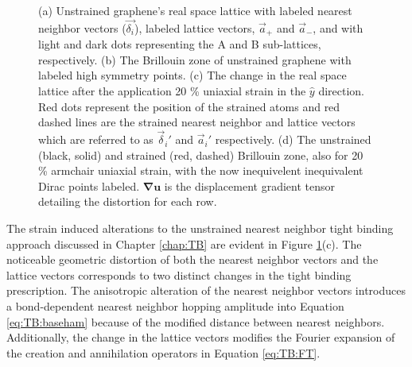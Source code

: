 \begin{figure}
  
  \caption{\label{fig:PVP:lattice} (a) Unstrained graphene's real space lattice with labeled nearest neighbor vectors ($\vec{\delta_i}$), labeled lattice vectors, $\vec{a}_+$ and  $\vec{a}_-$, and with light and dark dots representing the A and B sub-lattices, respectively. (b) The Brillouin zone of unstrained graphene with labeled high symmetry points. (c) The change in the real space lattice after the application 20 \% uniaxial strain in the $\hat{y}$ direction.  Red dots represent the position of the strained atoms and red dashed lines are the strained nearest neighbor and lattice vectors which are referred to as $\vec{\delta}_i'$ and $\vec{a}_i'$ respectively.  (d) The unstrained (black, solid) and strained (red, dashed) Brillouin zone, also for 20 \% armchair uniaxial strain, with the now inequivelent inequivalent Dirac points labeled.  $\bm{\nabla u}$ is the displacement gradient tensor detailing the distortion for each row.}
\end{figure}

The strain induced alterations to the unstrained nearest neighbor tight binding approach discussed in Chapter \ref{chap:TB} are evident in Figure \ref{fig:PVP:lattice}(c).
The noticeable geometric distortion of both the nearest neighbor vectors and the lattice vectors corresponds to two distinct changes in the tight binding prescription.
The anisotropic alteration of the nearest neighbor vectors introduces a bond-dependent nearest neighbor hopping amplitude\cite{Hasegawa2006} into Equation \ref{eq:TB:baseham} because of the modified distance between nearest neighbors.
Additionally, the change in the lattice vectors modifies the Fourier expansion of the creation and annihilation operators in Equation \ref{eq:TB:FT}. 

